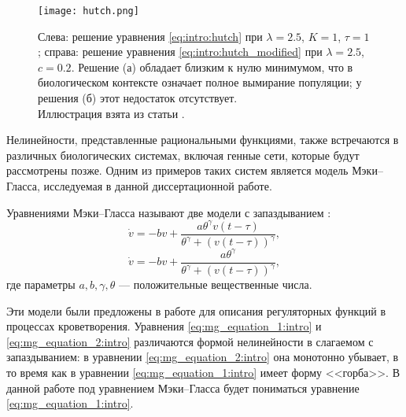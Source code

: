 

	
\begin{figure}
	\centering
	\texttt{[image: hutch.png]}
	\caption{Слева: решение уравнения \eqref{eq:intro:hutch} при $\lambda = 2.5$, $K = 1$, $\tau = 1$; справа: решение уравнения \eqref{eq:intro:hutch_modified} при $\lambda = 2.5$, $c = 0.2$. Решение (а) обладает близким к нулю минимумом, что в биологическом контексте означает полное вымирание популяции; у решения (б) этот недостаток отсутствует.\\Иллюстрация взята из статьи \cite{Kolesov2010}.}
	\label{fig:intro:hutch}
\end{figure}

Нелинейности, представленные рациональными функциями, также встречаются в различных биологических системах, включая генные сети, которые будут рассмотрены позже. Одним из примеров таких систем является модель Мэки--Гласса, исследуемая в данной диссертационной работе.

Уравнениями Мэки--Гласса называют две модели с запаздыванием \cite{Mackey1977, Glass1988}:
\begin{equation}
	\label{eq:mg_equation_1:intro}
	\dot{v}=-b v+\frac{a \theta^{\gamma} v(t-\tau)}{\theta^{\gamma}+(v(t-\tau))^{\gamma}},
\end{equation}
\begin{equation}
	\label{eq:mg_equation_2:intro}
	\dot{v}=-b v+\frac{a \theta^{\gamma}}{\theta^{\gamma}+(v(t-\tau))^{\gamma}},
\end{equation}
где параметры $a, b, \gamma, \theta$ --- положительные вещественные числа.

Эти модели были предложены в работе \cite{Mackey1977} для описания регуляторных функций в процессах кроветворения. Уравнения \eqref{eq:mg_equation_1:intro} и \eqref{eq:mg_equation_2:intro} различаются формой нелинейности в слагаемом с запаздыванием: в уравнении \eqref{eq:mg_equation_2:intro} она монотонно убывает, в то время как в уравнении \eqref{eq:mg_equation_1:intro} имеет форму <<горба>>. В данной работе под уравнением Мэки--Гласса будет пониматься уравнение \eqref{eq:mg_equation_1:intro}.

